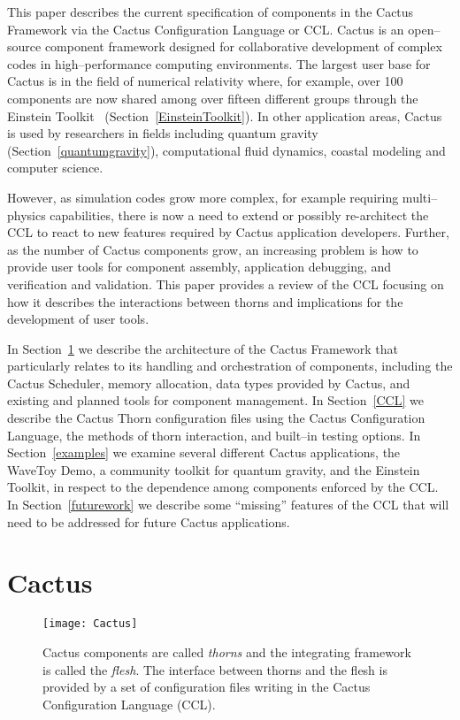 \documentclass[conference]{IEEEtran}
\newcommand{\ccl}{Cactus Configuration Language}
\begin{document}
This paper describes the current specification of components in the Cactus Framework via the Cactus 
Configuration Language or CCL\@. Cactus is an open--source component framework designed 
for collaborative development of complex codes in high--performance computing environments. 
The largest user base for Cactus  is in the field of numerical relativity where, for example,
over 100 components are now shared among over fifteen different groups through the Einstein Toolkit~\cite{einsteintoolkitweb} (Section~\ref{EinsteinToolkit}). 
In other application areas, Cactus is used by researchers in fields including quantum gravity (Section~\ref{quantumgravity}), computational fluid dynamics, 
coastal modeling and computer science. 

However, as simulation codes grow more complex, for example requiring multi--physics capabilities,
there is now a need to extend or possibly re-architect the CCL to react to new features required by Cactus 
application developers. Further, as the number of Cactus components grow, an increasing problem is 
how to provide user tools for component assembly, application debugging, and verification and validation.
This paper provides a review of the CCL focusing on how it describes the interactions between thorns  and implications
for the development of user tools. 




In Section~\ref{cactus} we describe the architecture of the Cactus Framework that particularly
relates to its handling and 
orchestration of components, including the Cactus 
Scheduler, memory allocation, data types provided by Cactus, and existing and planned tools for component management.
In Section~\ref{CCL} we describe the Cactus Thorn 
configuration files using the \ccl, the methods of thorn interaction, and built--in testing options.
In Section~\ref{examples} we examine several different Cactus applications, the WaveToy Demo, a community 
toolkit for quantum gravity, 
and the  Einstein Toolkit, in respect to the dependence among components enforced by the CCL\@.
In Section~\ref{futurework} we describe some ``missing'' features of the CCL that will need to be addressed for future Cactus applications. 

\section{Cactus}
\label{cactus}

\begin{figure}[t!]
\centering
\texttt{[image: Cactus]}
\label{cactusfig}
\caption{Cactus components are called {\it thorns} and the integrating framework is called the {\it flesh}. The interface between thorns and the flesh is provided by a set of configuration files writing in the Cactus Configuration Language (CCL\@).}
\end{figure}
\end{document}
